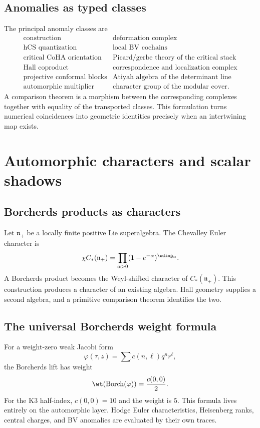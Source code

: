 \chapter{Anomalies as typed classes}
The principal anomaly classes are
\[
\begin{array}{c|c}
\text{construction}&\text{deformation complex}\\ \hline
\text{hCS quantization}&\text{local BV cochains}\\
\text{critical CoHA orientation}&\text{Picard/gerbe theory of the critical stack}\\
\text{Hall coproduct}&\text{correspondence and localization complex}\\
\text{projective conformal blocks}&\text{Atiyah algebra of the determinant line}\\
\text{automorphic multiplier}&\text{character group of the modular cover}.
\end{array}
\]
A comparison theorem is a morphism between the corresponding complexes together with equality of the transported classes. This formulation turns numerical coincidences into geometric identities precisely when an intertwining map exists.

\part[Automorphic forms]{Automorphic characters and scalar shadows}

\chapter{Borcherds products as characters}
Let $\mathfrak n_+$ be a locally finite positive Lie superalgebra. The Chevalley Euler character is
\[
 \chi C_*(\mathfrak n_+)
 =\prod_{\alpha>0}(1-e^{-\alpha})^{\sdim\mathfrak g_\alpha}.
\]
A Borcherds product becomes the Weyl-shifted character of $C_*(\mathfrak n_+)$. This construction produces a character of an existing algebra. Hall geometry supplies a second algebra, and a primitive comparison theorem identifies the two.

\chapter{The universal Borcherds weight formula}
For a weight-zero weak Jacobi form
\[
 \varphi(\tau,z)=\sum c(n,\ell)q^nr^\ell,
\]
the Borcherds lift has weight
\[
 \wt(\operatorname{Borch}(\varphi))=\frac{c(0,0)}2.
\]
For the K3 half-index, $c(0,0)=10$ and the weight is $5$. This formula lives entirely on the automorphic layer. Hodge Euler characteristics, Heisenberg ranks, central charges, and BV anomalies are evaluated by their own traces.

